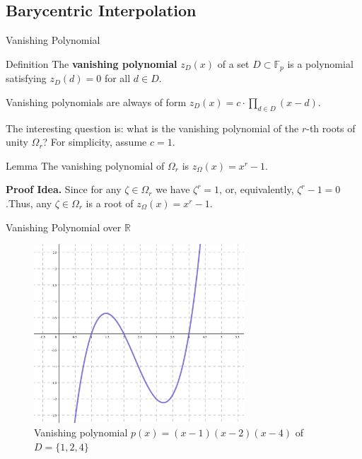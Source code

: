 \documentclass{zkdl-presentation-template}
\begin{document}
    \subsection{Barycentric Interpolation}
    \begin{frame}{Vanishing Polynomial}
        \begin{block}{Definition}
            The \textbf{vanishing polynomial} $z_D(x)$ of a set $D \subset \mathbb{F}_p$
            is a polynomial satisfying $z_D(d) = 0$ for all $d \in D$.\pause
        \end{block}
        Vanishing polynomials are always of form $z_D(x) = c \cdot \prod_{d \in
        D}(x-d)$. \pause

        The interesting question is: what is the vanishing polynomial of the
        $r$-th roots of unity $\Omega_r$? For simplicity, assume $c=1$.\pause

        \begin{block}{Lemma}
            The vanishing polynomial of $\Omega_r$ is $z_{\Omega}(x) = x^r-1$.\pause
        \end{block}

        \textbf{Proof Idea.} Since for any $\zeta \in \Omega_r$ we have $\zeta^r=1$, or, 
        equivalently, $\zeta^r-1=0$.\pause Thus, any $\zeta \in \Omega_r$ is a root of $z_{\Omega}(x) = x^r-1$.
    \end{frame}

    \begin{frame}{Vanishing Polynomial over $\mathbb{R}$}
        \begin{figure}
            \centering
            \includegraphics[width=0.7\textwidth]{images/lecture_13/vanishing.png}
            \caption{Vanishing polynomial $p(x)=(x-1)(x-2)(x-4)$ of $D=\{1,2,4\}$}
        \end{figure}
    \end{frame}
\end{document}
